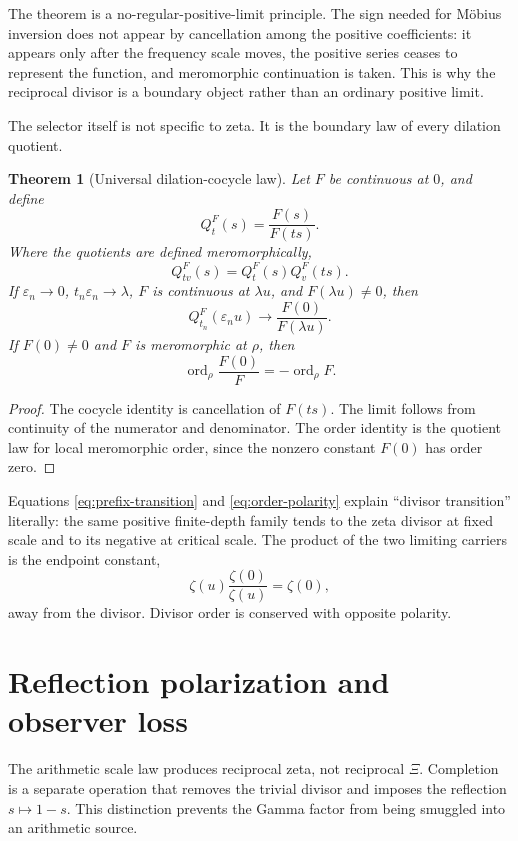 \documentclass[11pt]{article}
\newtheorem{theorem}{Theorem}[section]
\theoremstyle{definition}
\theoremstyle{remark}
\newcommand{\ord}{\operatorname{ord}}
\begin{document}
The theorem is a no-regular-positive-limit principle.  The sign needed for M\"obius inversion
does not appear by cancellation among the positive coefficients: it appears only after the
frequency scale moves, the positive series ceases to represent the function, and meromorphic
continuation is taken.  This is why the reciprocal divisor is a boundary object rather than an
ordinary positive limit.

The selector itself is not specific to zeta.  It is the boundary law of every dilation quotient.

\begin{theorem}[Universal dilation-cocycle law]\label{thm:universal-cocycle}
Let \(F\) be continuous at \(0\), and define
\[
 Q_t^F(s)=\frac{F(s)}{F(ts)}.
 \tag{7.12}
\]
Where the quotients are defined meromorphically,
\[
 Q_{tv}^F(s)=Q_t^F(s)Q_v^F(ts).
 \tag{7.13}
\]
If \(\varepsilon_n\to0\), \(t_n\varepsilon_n\to\lambda\), \(F\) is continuous at
\(\lambda u\), and \(F(\lambda u)\ne0\), then
\[
 Q_{t_n}^F(\varepsilon_nu)
 \longrightarrow\frac{F(0)}{F(\lambda u)}.
 \tag{7.14}
\]
If \(F(0)\ne0\) and \(F\) is meromorphic at \(\rho\), then
\[
 \ord_\rho\frac{F(0)}{F}=-\ord_\rho F.
 \label{eq:order-polarity}
 \tag{7.15}
\]
\end{theorem}

\begin{proof}
The cocycle identity is cancellation of \(F(ts)\).  The limit follows from continuity of the
numerator and denominator.  The order identity is the quotient law for local meromorphic order,
since the nonzero constant \(F(0)\) has order zero.
\end{proof}

Equations \eqref{eq:prefix-transition} and \eqref{eq:order-polarity} explain ``divisor transition''
literally: the same positive finite-depth family tends to the zeta divisor at fixed scale and to
its negative at critical scale.  The product of the two limiting carriers is the endpoint
constant,
\[
 \zeta(u)\frac{\zeta(0)}{\zeta(u)}=\zeta(0),
 \tag{7.16}
\]
away from the divisor.  Divisor order is conserved with opposite polarity.

\section{Reflection polarization and observer loss}\label{sec:polarization}

The arithmetic scale law produces reciprocal zeta, not reciprocal \(\Xi\).  Completion is a
separate operation that removes the trivial divisor and imposes the reflection
\(s\mapsto1-s\).  This distinction prevents the Gamma factor from being smuggled into an
arithmetic source.
\end{document}
